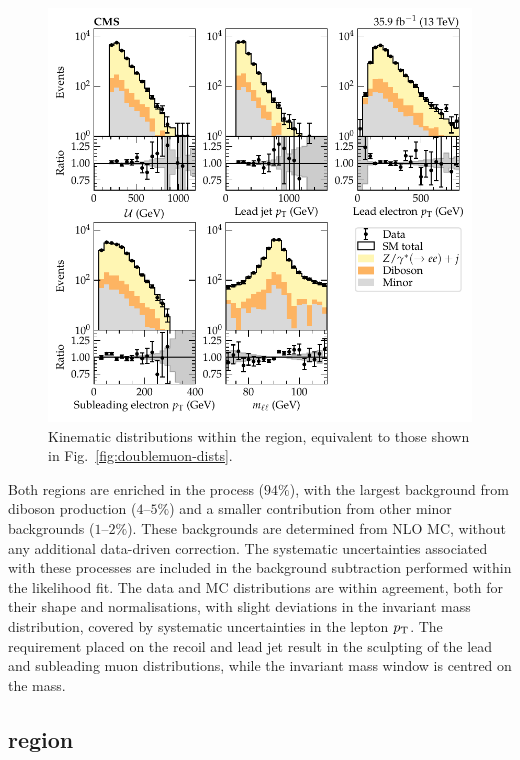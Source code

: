 \begin{figure}[htb]
    \centering
    \includegraphics{chapters/043_results/images/doubleelectron_dists.pdf}
    \caption[Dielectron kinematics.]{
        Kinematic distributions within the \dieleplusjets region, equivalent to those shown in Fig.~\ref{fig:doublemuon-dists}.
    }
    \label{fig:doubleelectron-dists}
\end{figure}
%
Both regions are enriched in the \IDYllj process ($94\%$), with the largest background from diboson production ($4$--$5\%$) and a smaller contribution from other minor backgrounds ($1$--$2\%$). These backgrounds are determined from NLO MC, without any additional data-driven correction. The systematic uncertainties associated with these processes are included in the background subtraction performed within the likelihood fit. The data and MC distributions are within agreement, both for their shape and normalisations, with slight deviations in the invariant mass distribution, covered by systematic uncertainties in the lepton $p_{\text{T}}$. The requirement placed on the recoil and lead jet \pt result in the sculpting of the lead and subleading muon distributions, while the invariant mass window is centred on the \PZ mass.


\subsection{\metplusjets region}

